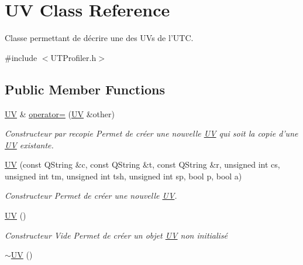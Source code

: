 \hypertarget{class_u_v}{\section{U\-V Class Reference}
\label{class_u_v}
}


Classe permettant de décrire une des U\-Vs de l'U\-T\-C.  




{\ttfamily \#include $<$U\-T\-Profiler.\-h$>$}

\subsection*{Public Member Functions}
\begin{DoxyCompactItemize}
\item 
\hyperlink{class_u_v}{U\-V} \& \hyperlink{class_u_v_a47a46e1cf24e173b0b9694a4f404bb83}{operator=} (\hyperlink{class_u_v}{U\-V} \&other)
\begin{DoxyCompactList}\small\item\em Constructeur par recopie Permet de créer une nouvelle \hyperlink{class_u_v}{U\-V} qui soit la copie d'une \hyperlink{class_u_v}{U\-V} existante. \end{DoxyCompactList}\item 
\hyperlink{class_u_v_a4d98d82525d78e85c003c9acf2ee69bf}{U\-V} (const Q\-String \&c, const Q\-String \&t, const Q\-String \&r, unsigned int cs, unsigned int tm, unsigned int tsh, unsigned int sp, bool p, bool a)
\begin{DoxyCompactList}\small\item\em Constructeur Permet de créer une nouvelle \hyperlink{class_u_v}{U\-V}. \end{DoxyCompactList}\item 
\hypertarget{class_u_v_a898ad6c26e847fac8de1bd0cf4b88e92}{\hyperlink{class_u_v_a898ad6c26e847fac8de1bd0cf4b88e92}{U\-V} ()}\label{class_u_v_a898ad6c26e847fac8de1bd0cf4b88e92}

\begin{DoxyCompactList}\small\item\em Constructeur Vide Permet de créer un objet \hyperlink{class_u_v}{U\-V} non initialisé \end{DoxyCompactList}\item 
\hypertarget{class_u_v_a462f4f55409e6db802ed337a535678a7}{\hyperlink{class_u_v_a462f4f55409e6db802ed337a535678a7}{$\sim$\-U\-V} ()}\label{class_u_v_a462f4f55409e6db802ed337a535678a7}


\end{DoxyCompactItemize}
